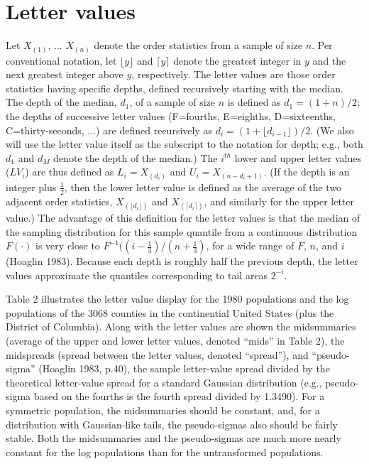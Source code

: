 \documentclass[oneside]{article}
\begin{document}
\section {Letter values}

Let $X_{(1)}$, ...  $X_{(n)}$ denote the order statistics
from a sample of size $n$.
Per conventional notation, let $\lfloor y \rfloor$ and
$\lceil y \rceil$ denote the greatest integer in $y$ and
the next greatest integer above $y$, respectively.
The letter values are those order statistics having specific
depths, defined recursively starting with the median.
The depth of the median, $d_1$, of a sample of size $n$
is defined as $d_1 = (1 +  n )/2$; the depths
of successive letter values (F=fourths, E=eighths, 
D=sixteenths, C=thirty-seconds, ...) are defined recursively 
as $d_i = (1 + \lfloor d_{i-1} \rfloor)/2$.  
(We also will use the letter value itself as the subscript
to the notation for depth; e.g., both $d_1$ and $d_M$ denote
the depth of the median.)
The $i^{th}$ lower and upper letter values  ($LV_i$) 
are thus defined as $L_i = X_{(d_i)}$ and
$U_i = X_{(n-d_i+1)}$.
(If the depth is an integer plus $\frac{1}{2}$, then the lower 
letter value is defined as the average of the two adjacent order
statistics, $X_{(\lfloor d_i \rfloor)}$ and
$X_{(\lceil d_i \rceil)}$, and similarly for the upper
letter value.)
The advantage of this definition for the letter values
is that the median of the sampling distribution for
this sample quantile from a
continuous distribution $F(\cdot)$ is very close to
$F^{-1} ((i - \frac{1}{3})/(n + \frac{1}{3})$, for a 
wide range of $F$, $n$, and $i$ (Hoaglin 1983).
Because each depth is roughly half the previous depth,
the letter values approximate the quantiles corresponding
to tail areas $2^{-i}$.

Table 2 illustrates the letter value display for the 1980 
populations and the log populations of the 3068 counties in 
the continential United States (plus the District of Columbia).
Along with the letter values are shown the midsummaries
(average of the upper and lower letter values, denoted ``mids''
in Table 2), 
the midspreads (spread between the letter values, denoted
``spread''), and ``pseudo-sigma'' (Hoaglin 1983, p.40), 
the sample letter-value spread divided by the theoretical
letter-value spread for a standard Gaussian
distribution (e.g., pseudo-sigma based on the fourths is 
the fourth spread divided by 1.3490).
For a symmetric population, the midsummaries should
be constant, and, for a distribution with Gaussian-like
tails, the pseudo-sigmas also should be fairly stable.
Both the midsummaries and the pseudo-sigmas are much more
nearly constant for the log populations than for the
untransformed populations.
\end{document}
